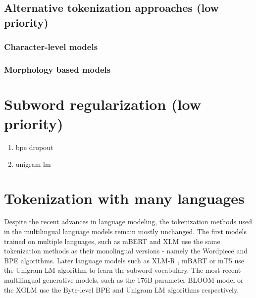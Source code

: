 \subsection{Alternative tokenization approaches (low priority)}

\subsubsection{Character-level models}
\subsubsection{Morphology based models}

\section{Subword regularization (low priority)}

\begin{enumerate}
    \item bpe dropout
    \item unigram lm
\end{enumerate}



\section{Tokenization with many languages}

Despite the recent advances in language modeling, the tokenization methods used in the multilingual language models remain mostly unchanged. The first models trained on multiple languages, such as mBERT \cite{devlin_bert_2019} and XLM \cite{lample_cross-lingual_2019} use the same tokenization methods as their monolingual versions - namely the Wordpiece and BPE algorithms. Later language models such as XLM-R \cite{conneau_unsupervised_2020}, mBART \cite{liu_multilingual_2020} or mT5 \cite{xue_mt5_2021} use the Unigram LM algorithm to learn the subword vocabulary. The most recent multilingual generative models, such as the 176B parameter BLOOM model \cite{scao_bloom_2022} or the XGLM \cite{lin_few-shot_2022} use the Byte-level BPE and Unigram LM algorithms respectively.




